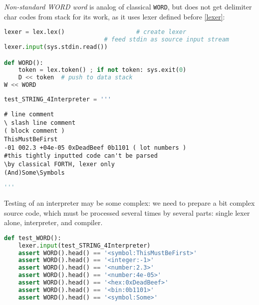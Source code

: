 \emph{Non-standard WORD word} is analog of classical \verb|WORD|, but does not
get delimiter char codes from stack for its work, as it uses lexer
defined before \ref{lexer}:
\begin{lstlisting}[language=Python]
lexer = lex.lex()              		 # create lexer
							# feed stdin as source input stream
lexer.input(sys.stdin.read())

def WORD():
	token = lex.token() ; if not token: sys.exit(0)
	D << token	# push to data stack
W << WORD
\end{lstlisting}
\clearpage\noindent
\begin{lstlisting}[language=Python]
test_STRING_4Interpreter = '''
\end{lstlisting}
\begin{lstlisting}[language=Forth]
# line comment
\ slash line comment
( block comment )
ThisMustBeFirst
-01 002.3 +04e-05 0xDeadBeef 0b1101 ( lot numbers )
#this tightly inputted code can't be parsed 
\by classical FORTH, lexer only
(And)Some\Symbols
\end{lstlisting}
\begin{lstlisting}[language=Python]
'''
\end{lstlisting}
Testing of an interpreter may be some complex: we need to prepare a bit complex
source code, which must be processed several times by several parts: single
lexer alone, interpreter, and compiler.
\begin{lstlisting}[language=Python]
def test_WORD():
	lexer.input(test_STRING_4Interpreter)
	assert WORD().head() == '<symbol:ThisMustBeFirst>'
	assert WORD().head() == '<integer:-1>'
	assert WORD().head() == '<number:2.3>'
	assert WORD().head() == '<number:4e-05>'
	assert WORD().head() == '<hex:0xDeadBeef>'
	assert WORD().head() == '<bin:0b1101>'
	assert WORD().head() == '<symbol:Some>'
\end{lstlisting}
    